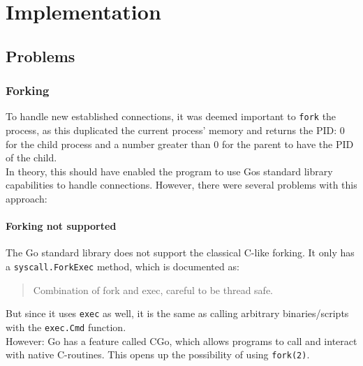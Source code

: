 \documentclass[10pt,a4paper,titlepage,twoside,english,final]{zhawreprt}
\begin{document}
\chapter{Implementation}\label{chp:Implementation}
\section{Problems}\label{sec:Problems}
\subsection{Forking}\label{ssec:Forking}
To handle new established connections, it was deemed important to \texttt{fork} the process, as this duplicated the current process' memory and returns the \gls{PID}: 0 for the child process and a number greater than 0 for the parent to have the \gls{PID} of the child.\\
In theory, this should have enabled the program to use \gls{Go}s standard library capabilities to handle connections. However, there were several problems with this approach:

\subsubsection{Forking not supported}\label{sssec:ForkingNotSupported}
The \gls{Go} standard library does not support the classical \gls{C}-like forking. It only has a \texttt{syscall.ForkExec} method, which is documented as:
\begin{quote}
Combination of fork and exec, careful to be thread safe.
\end{quote}
But since it uses \texttt{exec} as well, it is the same as calling arbitrary binaries/scripts with the \texttt{exec.Cmd} function.\\
However: \gls{Go} has a feature called \gls{CGo}, which allows programs to call and interact with native \gls{C}-routines. This opens up the possibility of using \texttt{fork(2)}.
\end{document}
